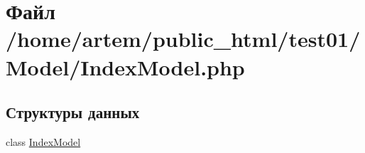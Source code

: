 \hypertarget{_index_model_8php}{\section{Файл /home/artem/public\-\_\-html/test01/\-Model/\-Index\-Model.php}
\label{_index_model_8php}
}
\subsection*{Структуры данных}
\begin{DoxyCompactItemize}
\item 
class \hyperlink{class_index_model}{Index\-Model}
\end{DoxyCompactItemize}
